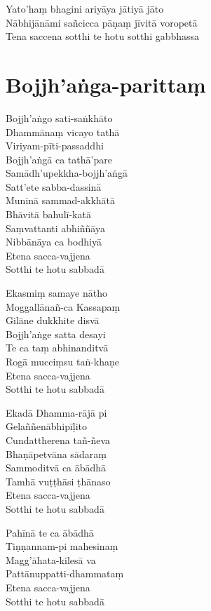\begin{paritta}
Yato'haṃ bhagini ariyāya jātiyā jāto\\
Nābhijānāmi sañcicca pāṇaṃ jīvitā voropetā\\
Tena saccena sotthi te hotu sotthi gabbhassa

\end{paritta}

\clearpage

\chapter{Bojjh'aṅga-parittaṃ}%

\begin{paritta}
Bojjh'aṅgo sati-saṅkhāto\\
Dhammānaṃ vicayo tathā\\
Viriyam-pīti-passaddhi\\
Bojjh'aṅgā ca tathā'pare\\
Samādh'upekkha-bojjh'aṅgā\\
Satt'ete sabba-dassinā\\
Muninā sammad-akkhātā\\
Bhāvitā bahulī-katā\\
Saṃvattanti abhiññāya\\
Nibbānāya ca bodhiyā\\
Etena sacca-vajjena\\
Sotthi te hotu sabbadā

Ekasmiṃ samaye nātho\\
Moggallānañ-ca Kassapaṃ\\
Gilāne dukkhite disvā\\
Bojjh'aṅge satta desayi\\
Te ca taṃ abhinanditvā\\
Rogā mucciṃsu taṅ-khaṇe\\
Etena sacca-vajjena\\
Sotthi te hotu sabbadā

Ekadā Dhamma-rājā pi\\
Gelaññenābhipīḷito\\
Cundattherena tañ-ñeva\\
Bhaṇāpetvāna sādaraṃ\\
Sammoditvā ca ābādhā\\
Tamhā vuṭṭhāsi ṭhānaso\\
Etena sacca-vajjena\\
Sotthi te hotu sabbadā

Pahīnā te ca ābādhā\\
Tiṇṇannam-pi mahesinaṃ\\
Magg'āhata-kilesā va\\
Pattānuppatti-dhammataṃ\\
Etena sacca-vajjena\\
Sotthi te hotu sabbadā

\end{paritta}

